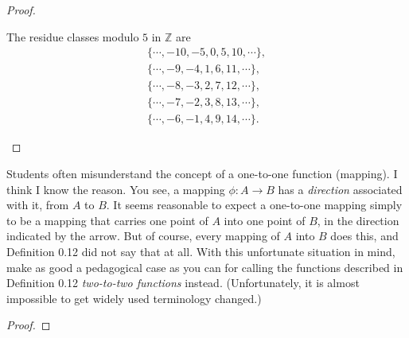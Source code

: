 \begin{proof}
\begin{enumerate}
              The residue classes modulo $5$ in $\mathbb{Z}$ are
              \[
                  \begin{split}
                      \{ \cdots, -10, -5, 0, 5, 10, \cdots \}, \\
                      \{ \cdots, -9, -4, 1, 6, 11, \cdots \}, \\
                      \{ \cdots, -8, -3, 2, 7, 12, \cdots \}, \\
                      \{ \cdots, -7, -2, 3, 8, 13, \cdots \}, \\
                      \{ \cdots, -6, -1, 4, 9, 14, \cdots \}.
                  \end{split}
              \]
    \end{enumerate}
\end{proof}

\begin{exercise}
    Students often misunderstand the concept of a one-to-one function (mapping). I think I know the reason. You see, a mapping $\phi: A \to B$ has a \textit{direction} associated with it, from $A$ to $B$. It seems reasonable to expect a one-to-one mapping simply to be a mapping that carries one point of $A$ into one point of $B$, in the direction indicated by the arrow. But of course, every mapping of $A$ into $B$ does this, and Definition 0.12 did not say that at all. With this unfortunate situation in mind, make as good a pedagogical case as you can for calling the functions described in Definition 0.12 \textit{two-to-two functions} instead. (Unfortunately, it is almost impossible to get widely used terminology changed.)
\end{exercise}

\begin{proof}
\end{proof}
